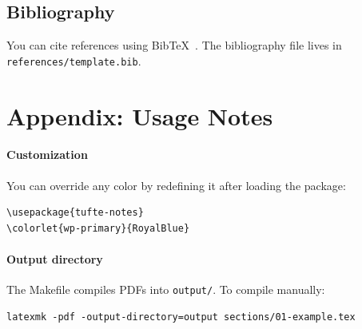 \documentclass{tufte-handout}
\begin{document}
\subsection{Bibliography}

You can cite references using Bib\TeX\ \cite{goodfellow2016}.
The bibliography file lives in \texttt{references/template.bib}.

\newpage
\hypersetup{linkcolor=wp-text}
\appendix
\section{Appendix: Usage Notes}

\paragraph{Customization}
You can override any color by redefining it after loading the package:
\begin{verbatim}
\usepackage{tufte-notes}
\colorlet{wp-primary}{RoyalBlue}
\end{verbatim}

\paragraph{Output directory}
The Makefile compiles PDFs into \texttt{output/}. To compile manually:
\begin{verbatim}
latexmk -pdf -output-directory=output sections/01-example.tex
\end{verbatim}



\end{document}
